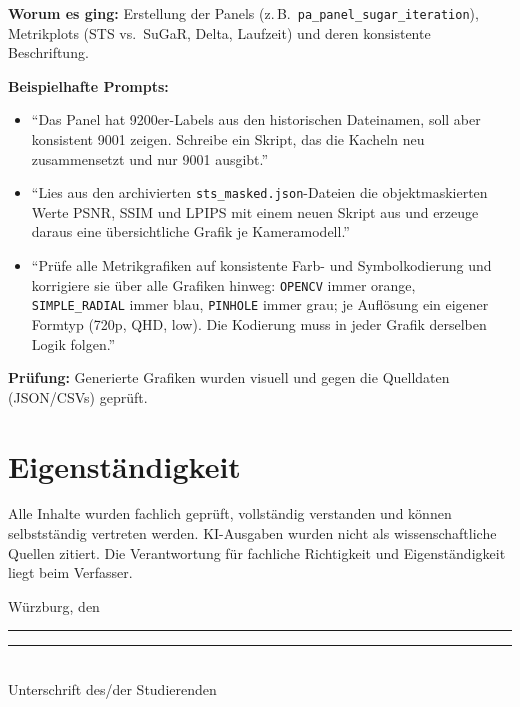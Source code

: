 \documentclass[12pt,a4paper]{article}
\begin{document}
\textbf{Worum es ging:} Erstellung der Panels (z.\,B.\ \texttt{pa\_panel\_sugar\_iteration}), Metrikplots (STS vs.\ SuGaR, Delta, Laufzeit) und deren konsistente Beschriftung.

\textbf{Beispielhafte Prompts:}
\begin{itemize}
  \item \enquote{Das Panel hat 9200er-Labels aus den historischen Dateinamen, soll aber konsistent 9001 zeigen. Schreibe ein Skript, das die Kacheln neu zusammensetzt und nur 9001 ausgibt.}
  \item \enquote{Lies aus den archivierten \texttt{sts\_masked.json}-Dateien die objektmaskierten Werte PSNR, SSIM und LPIPS mit einem neuen Skript aus und erzeuge daraus eine übersichtliche Grafik je Kameramodell.}
  \item \enquote{Prüfe alle Metrikgrafiken auf konsistente Farb- und Symbolkodierung und korrigiere sie über alle Grafiken hinweg: \texttt{OPENCV} immer orange, \texttt{SIMPLE\_RADIAL} immer blau, \texttt{PINHOLE} immer grau; je Auflösung ein eigener Formtyp (720p, QHD, low). Die Kodierung muss in jeder Grafik derselben Logik folgen.}
\end{itemize}

\textbf{Prüfung:} Generierte Grafiken wurden visuell und gegen die Quelldaten (JSON/CSVs) geprüft.

\section{Eigenständigkeit}

Alle Inhalte wurden fachlich geprüft, vollständig verstanden und können selbstständig vertreten werden. KI-Ausgaben wurden nicht als wissenschaftliche Quellen zitiert. Die Verantwortung für fachliche Richtigkeit und Eigenständigkeit liegt beim Verfasser.

\vfill
\noindent Würzburg, den \rule{4cm}{0.4pt}\hfill
\rule{6cm}{0.4pt}\\
\hfill Unterschrift des/der Studierenden
\end{document}
